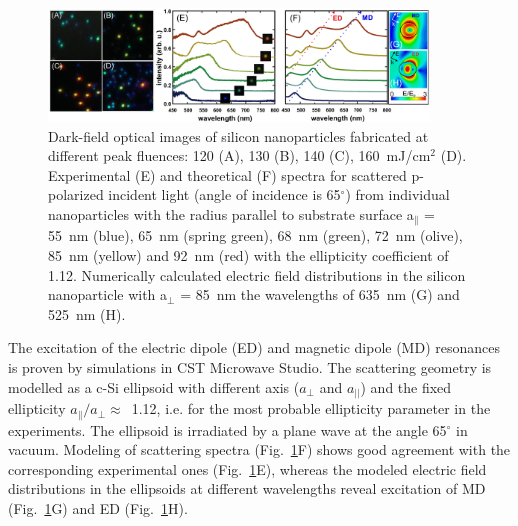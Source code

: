         \begin{figure}[!ht]
                \begin{center}
                    \includegraphics[width=0.9\textwidth]{figs/results/char/DarkField.eps}
                \end{center}
                \caption{Dark-field optical images of silicon nanoparticles fabricated at different peak fluences:
                120 (A), 130 (B), 140 (C), 160~mJ/cm$^{2}$ (D). Experimental (E) and theoretical (F) spectra for
                scattered p-polarized incident light (angle of incidence is 65$^{\circ}$) from individual nanoparticles
                with the radius parallel to substrate surface a$_{\parallel}$ = 55~nm (blue), 65~nm (spring green),
                68~nm (green), 72~nm (olive), 85~nm (yellow) and 92~nm (red) with the ellipticity coefficient of 1.12.
                Numerically calculated electric field distributions in the silicon nanoparticle with a$_{\perp}$ = 85~nm
                 the wavelengths of 635~nm (G) and 525~nm (H).}
                \label{fig:Darkfield}
        \end{figure}


        The excitation of the electric dipole (ED) and magnetic dipole (MD) resonances is proven by simulations
        in CST Microwave Studio. The scattering geometry is modelled as a c-Si ellipsoid with different axis
        ($a_{\perp}$ and $a_{||}$) and the fixed ellipticity $a_{\parallel}/a_{\perp}\approx$~1.12, i.e. for
        the most probable ellipticity parameter in the experiments. The ellipsoid is irradiated by a plane wave
        at the angle 65$^{\circ}$ in vacuum. Modeling of scattering spectra (Fig.~\ref{fig:Darkfield}F) shows good agreement
        with the corresponding experimental ones (Fig.~\ref{fig:Darkfield}E), whereas the modeled electric field distributions
        in the ellipsoids at different wavelengths reveal excitation of MD (Fig.~\ref{fig:Darkfield}G) and ED (Fig.~\ref{fig:Darkfield}H).

    \subsection{}

